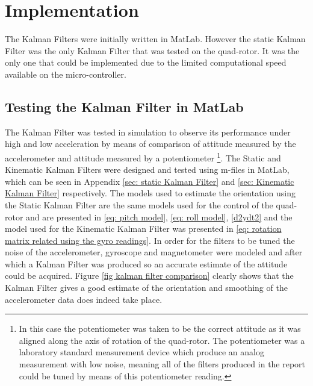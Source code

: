 \chapter{Implementation} \label{chap: kalman implem}
The Kalman Filters were initially written in MatLab. However the static Kalman Filter was the only Kalman Filter that was tested on the quad-rotor. It was the only one that could be implemented due to the limited computational speed available on the micro-controller.

\section{Testing the Kalman Filter in MatLab} \label{sec: kalman filter responces}

The Kalman Filter was tested in simulation to observe its performance under high and low acceleration by means of comparison of attitude measured by the accelerometer and attitude measured by a potentiometer \footnote{In this case the potentiometer was taken to be the correct attitude as it was aligned along the axis of rotation of the quad-rotor. The potentiometer was a laboratory standard measurement device which produce an analog measurement with low noise, meaning all of the filters produced in the report could be tuned by means of this potentiometer reading.}. The Static and Kinematic Kalman Filters were designed and tested using m-files in MatLab, which can be seen in Appendix \ref{sec: static Kalman Filter} and \ref{sec: Kinematic Kalman Filter} respectively. The models used to estimate the orientation using the Static Kalman Filter are the same models used for the control of the quad-rotor and are presented in \eqref{eq: pitch model}, \eqref{eq: roll model}, \eqref{d2ydt2} and the model used for the Kinematic Kalman Filter was presented in \eqref{eq: rotation matrix related using the gyro readings}. In order for the filters to be tuned the noise of the accelerometer, gyroscope and magnetometer were modeled and after which a Kalman Filter was produced so an accurate estimate of the attitude could be acquired. Figure \ref{fig kalman filter comparison} clearly shows that the Kalman Filter gives a good estimate of the orientation and smoothing of the accelerometer data does indeed take place.


